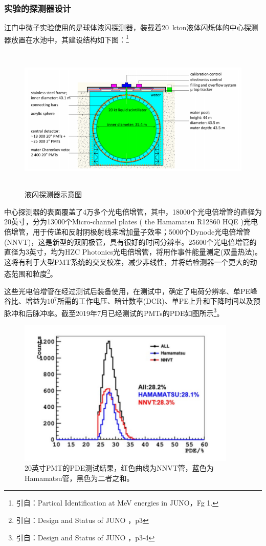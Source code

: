 \documentclass[10pt,a4paper]{article}
\begin{document}
\subsubsection{实验的探测器设计}\label{sub:logicinter}

江门中微子实验使用的是球体液闪探测器，装载着\SI{20}{kton}液体闪烁体的中心探测器放置在水池中，其建设结构如下图：\footnote{引自：Partical Identification at MeV energies in JUNO，Fg 1.}

\begin{figure}[ht]
 \centering
 \includegraphics[height=7cm]{images/探测器示意图.png}
 \caption{液闪探测器示意图}
 \label{fig:singleblock}
\end{figure}

中心探测器的表面覆盖了4万多个光电倍增管，其中，18000个光电倍增管的直径为20英寸，分为13000个Micro-channel plates ( the Hamamatsu R12860 HQE )光电倍增管，用于传递和反射阴极射线来增加量子效率；5000个Dynode光电倍增管(NNVT)，这是新型的双阴极管，具有很好的时间分辨率。25600个光电倍增管的直径为3英寸，均为HZC Photonics光电倍增管，将用作事件能量测定(双量热法)。这将有利于大型PMT系统的交叉校准，减少非线性，并将给检测器一个更大的动态范围和粒度\footnote{引自：Design and Status of JUNO ，p3}。

这些光电倍增管在经过测试后装备使用，在测试中，确定了电荷分辨率、单PE峰谷比、增益为$10^7$所需的工作电压、暗计数率(DCR)、单PE上升和下降时间以及预脉冲和后脉冲率。截至2019年7月已经测试的PMTs的PDE如图所示\footnote{引自：Design and Status of JUNO ，p3-4}。

\begin{figure}[ht]
 \centering
 \includegraphics[height=7cm]{images/pmt测试.png}
 \caption{20英寸PMT的PDE测试结果，红色曲线为NNVT管，蓝色为Hamamatsu管，黑色为二者之和。}
 \label{fig:singleblock}
\end{figure}
\end{document}
